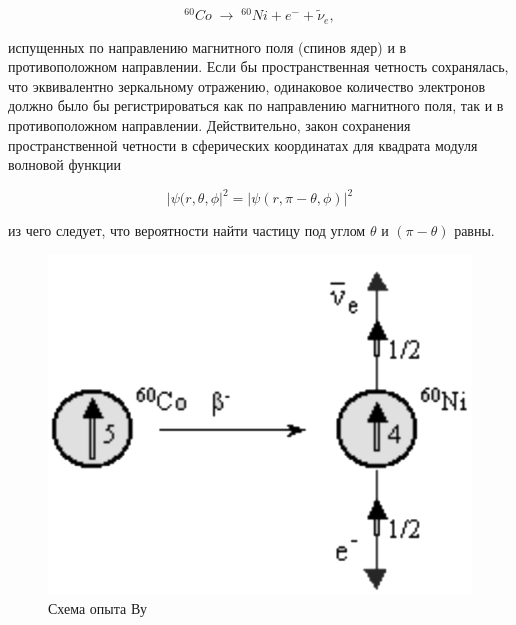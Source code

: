 \documentclass[a4paper]{article}
\begin{document}
$$^{60}Co \; \rightarrow \; ^{60}Ni + e^- + \tilde{\nu}_e,$$

испущенных по направлению магнитного поля (спинов ядер) и в противоположном направлении.
Если бы пространственная четность сохранялась, что эквивалентно зеркальному отражению, 
одинаковое количество электронов должно было бы регистрироваться как по направлению 
магнитного поля, так и в противоположном направлении. Действительно, закон сохранения 
пространственной четности в сферических координатах для квадрата модуля волновой функции

$$|\psi(r,\theta,\phi|^2 = |\psi(r,\pi - \theta, \phi)|^2$$

из чего следует, что вероятности найти частицу под углом $\theta$ и $(\pi - \theta)$ равны.

\begin{figure}[H]
    \begin{center}
    \begin{minipage}[h]{0.4\linewidth}
    \includegraphics[width=1\linewidth]{p1.png}
    \caption{Схема опыта Ву} 
    \label{p1}
    \end{minipage}
    \hfill 
    \begin{minipage}[h]{0.4\linewidth}

\end{minipage}
\end{center}
\end{figure}
\end{document}
